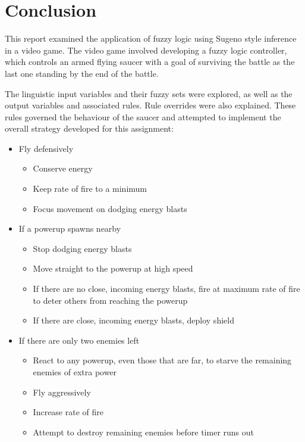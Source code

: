 \section{Conclusion}

This report examined the application of fuzzy logic using Sugeno style inference in a video game. The video game involved developing a fuzzy logic controller, which controls an armed flying saucer with a goal of surviving the battle as the last one standing by the end of the battle.

The linguistic input variables and their fuzzy sets were explored, as well as the output variables and associated rules. Rule overrides were also explained. These rules governed the behaviour of the saucer and attempted to implement the overall strategy developed for this assignment:

\begin{itemize}
\item Fly defensively
	\begin{itemize}
	\item Conserve energy
	\item Keep rate of fire to a minimum
	\item Focus movement on dodging energy blasts
	\end{itemize}
\item If a powerup spawns nearby
	\begin{itemize}
	\item Stop dodging energy blasts
	\item Move straight to the powerup at high speed
	\item If there are no close, incoming energy blasts, fire at maximum rate of fire to deter others from reaching the powerup
	\item If there are close, incoming energy blasts, deploy shield
	\end{itemize}
\item If there are only two enemies left
	\begin{itemize}
	\item React to any powerup, even those that are far, to starve the remaining enemies of extra power
	\item Fly aggressively
	\item Increase rate of fire
	\item Attempt to destroy remaining enemies before timer runs out
	\end{itemize}
\end{itemize}

